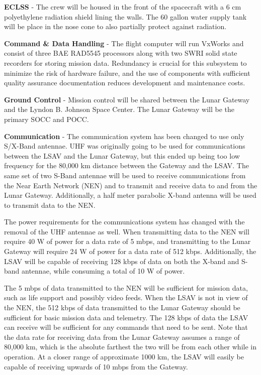 \documentclass[10pt]{article}
\begin{document}
\textbf{ECLSS} - The crew will be housed in the front of the spacecraft with a 6
cm polyethylene radiation shield lining the walls. The 60 gallon water
supply tank will be place in the nose cone to also partially protect
against radiation.

\textbf{Command \& Data Handling} - The flight computer will run
VxWorks and consist of three BAE RAD5545 processors along with two
SWRI solid state recorders for storing mission data. Redundancy is
crucial for this subsystem to minimize the risk of hardware failure,
and the use of components with sufficient quality assurance
documentation reduces development and maintenance costs.

\textbf{Ground Control} - Mission control will be shared between the Lunar
Gateway and the Lyndon B. Johnson Space Center. The Lunar Gateway will
be the primary SOCC and POCC.

\textbf{Communication} - The communication system has been changed to use only
S/X-Band antennae. UHF was originally going to be used for
communications between the LSAV and the Lunar Gateway, but this ended
up being too low frequency for the 80,000 km distance between the
Gateway and the LSAV. The same set of two S-Band antennae will be used
to receive communications from the Near Earth Network (NEN) and to
transmit and receive data to and from the Lunar Gateway. Additionally,
a half meter parabolic X-band antenna will be used to transmit data to
the NEN.

The power requirements for the communications system has changed with
the removal of the UHF antennae as well. When transmitting data to the
NEN will require 40 W of power for a data rate of 5 mbps, and
transmitting to the Lunar Gateway will require 24 W of power for a
data rate of 512 kbps. Additionally, the LSAV will be capable of
receiving 128 kbps of data on both the X-band and S-band antennae,
while consuming a total of 10 W of power.

The 5 mbps of data transmitted to the NEN will be sufficient for
mission data, such as life support and possibly video feeds. When the
LSAV is not in view of the NEN, the 512 kbps of data transmitted to
the Lunar Gateway should be sufficient for basic mission data and
telemetry. The 128 kbps of data the LSAV can receive will be
sufficient for any commands that need to be sent. Note that the data
rate for receiving data from the Lunar Gateway assumes a range of
80,000 km, which is the absolute farthest the two will be from each
other while in operation. At a closer range of approximate 1000 km,
the LSAV will easily be capable of receiving upwards of 10 mbps from
the Gateway.
\end{document}
